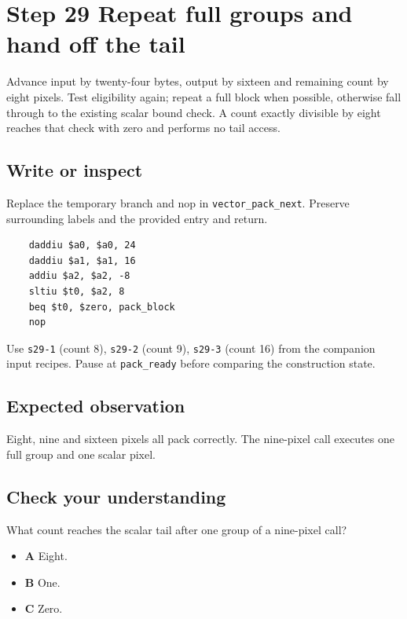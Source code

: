 \section{Step 29 Repeat full groups and hand off the tail}\label{rgb-s29}

Advance input by twenty-four bytes, output by sixteen and remaining count by eight pixels. Test eligibility again; repeat a full block when possible, otherwise fall through to the existing scalar bound check. A count exactly divisible by eight reaches that check with zero and performs no tail access.

\subsection{Write or inspect}
Replace the temporary branch and nop in \texttt{vector\_pack\_next}. Preserve surrounding labels and the provided entry and return.

\begin{verbatim}
    daddiu $a0, $a0, 24
    daddiu $a1, $a1, 16
    addiu $a2, $a2, -8
    sltiu $t0, $a2, 8
    beq $t0, $zero, pack_block
    nop
\end{verbatim}
Use \texttt{s29-1} (count 8), \texttt{s29-2} (count 9), \texttt{s29-3} (count 16) from the companion input recipes. Pause at \texttt{pack\_ready} before comparing the construction state.

\subsection{Expected observation}
Eight, nine and sixteen pixels all pack correctly. The nine-pixel call executes one full group and one scalar pixel.

\subsection{Check your understanding}
What count reaches the scalar tail after one group of a nine-pixel call?

\begin{itemize}
  \item \textbf{A} Eight.
  \item \textbf{B} One.
  \item \textbf{C} Zero.
\end{itemize}
